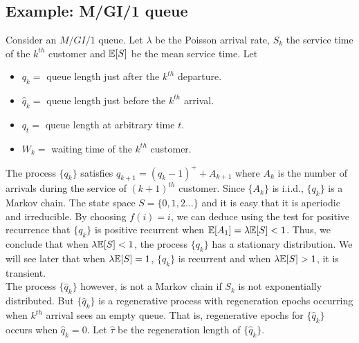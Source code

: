 \documentclass[all-lectures.tex]{subfiles}
\begin{document}

\setcounter{section}{4}
\setcounter{subsection}{0}

\section*{}
\subsection{Example: M/GI/1 queue}
Consider an $M/GI/1$ queue. Let $\lambda$  be the Poisson arrival rate, $S_k$ the service time of the $k^{th}$ customer and $\mathbb{E}[S]$ be the mean service time. Let 
\begin{itemize}
\item $q_k = $ queue length just after the $k^{th}$ departure. 
\item $\hat{q}_k = $ queue length just before the $k^{th}$ arrival. 
\item $q_t =$ queue length at arbitrary time $t$.
\item $W_k = $ waiting time of the $k^{th}$ customer.
\end{itemize}
The process $\{q_k\}$ satisfies $q_{k+1} = (q_k -1)^+ + A_{k+1}$ where $A_k$ is the number of arrivals during the service of $(k+1)^{th}$ customer. Since $\{A_k\}$ is i.i.d., $\{q_k\}$ is a Markov chain. The state space $S = \{0,1,2\dots\}$ and it is easy that it is aperiodic and irreducible. By choosing $f(i) = i$, we can deduce using the test for positive recurrence that $\{q_k\}$ is positive recurrent when $\mathbb{E}[A_1] = \lambda \mathbb{E}[S] < 1$. Thus, we conclude that when $\lambda \mathbb{E}[S] < 1$, the process $\{q_k\}$ has a stationary distribution. We will  see later that when $\lambda\mathbb{E}[S] = 1$, $\{q_k\}$ is recurrent and when $\lambda \mathbb{E}[S] > 1$, it is transient. \\
\indent  The process $\{\hat{q}_k\}$ however, is not a Markov chain if $S_k$ is not exponentially distributed. But $\{\hat{q}_k\}$ is a regenerative process with regeneration epochs occurring when $k^{th}$ arrival sees an empty queue. That is, regenerative epochs for $\{\hat{q}_k\}$ occurs when $ \hat{q}_k = 0$. Let $\hat{\tau}$ be the regeneration length of $\{\hat{q}_k\}$. \\
\end{document}
